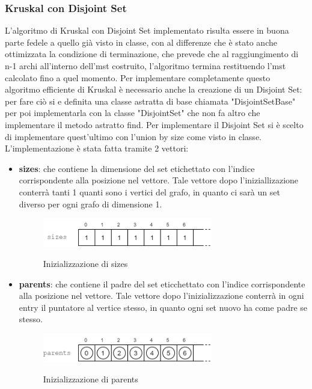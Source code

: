 \subsubsection{Kruskal con Disjoint Set}
L'algoritmo di Kruskal con Disjoint Set implementato risulta essere in buona parte fedele a quello già visto in classe, con al differenze che è stato anche ottimizzata la condizione di terminazione, che prevede che al raggiungimento di n-1 archi all'interno dell'mst costruito, l'algoritmo termina restituendo l'mst calcolato fino a quel momento. Per implementare completamente questo algoritmo efficiente di Kruskal è necessario anche la creazione di un Disjoint Set: per fare ciò si e definita una classe astratta di base chiamata "DisjointSetBase" per poi implementarla con la classe "DisjointSet" che non fa altro che implementare il metodo astratto find. Per implementare il Disjoint Set si è scelto di implementare quest'ultimo con l'union by size come visto in classe. L'implementazione è stata fatta tramite 2 vettori:
\begin{itemize}
    \item \textbf{sizes}: che contiene la dimensione del set etichettato con l'indice corrispondente alla posizione nel vettore. Tale vettore dopo l'iniziallizazione conterrà tanti 1 quanti sono i vertici del grafo, in quanto ci sarà un set diverso per ogni grafo di dimensione 1. 
    \begin{figure}[h]
    	\caption{Inizializzazione di sizes}
    	\centering
        \includegraphics[width=0.7\textwidth]{./images/DisjointSetSizesVector.png}
    	\label{fig:sizes}
    \end{figure}
    
    \item \textbf{parents}: che contiene il padre del set eticchettato con l'indice corrispondente alla posizione nel vettore. Tale vettore dopo l'inizializzazione conterrà in ogni entry il puntatore al vertice stesso, in quanto ogni set nuovo ha come padre se stesso.
    \begin{figure}[h]
    	\caption{Inizializzazione di parents}
    	\centering
    	\includegraphics[width=0.7\textwidth]{./images/DisjointSetParentsVector.png}
    	\label{fig:parents}
    \end{figure}
\end{itemize}

